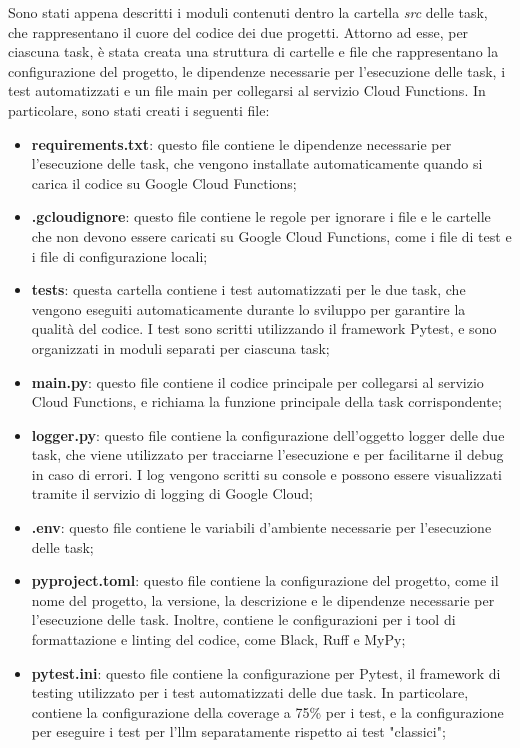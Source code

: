 Sono stati appena descritti i moduli contenuti dentro la cartella \emph{src} delle task, che rappresentano il cuore del codice dei due progetti. Attorno ad esse, per ciascuna task, è stata creata una struttura di cartelle e file che rappresentano la configurazione del progetto, le dipendenze necessarie per l'esecuzione delle task, i test automatizzati e un file main per collegarsi al servizio Cloud Functions. In particolare, sono stati creati i seguenti file:
\begin{itemize}
    \item \textbf{requirements.txt}: questo file contiene le dipendenze necessarie per l'esecuzione delle task, che vengono installate automaticamente quando si carica il codice su Google Cloud Functions;
    \item \textbf{.gcloudignore}: questo file contiene le regole per ignorare i file e le cartelle che non devono essere caricati su Google Cloud Functions, come i file di test e i file di configurazione locali;
    \item \textbf{tests}: questa cartella contiene i test automatizzati per le due task, che vengono eseguiti automaticamente durante lo sviluppo per garantire la qualità del codice. I test sono scritti utilizzando il framework Pytest, e sono organizzati in moduli separati per ciascuna task;
    \item \textbf{main.py}: questo file contiene il codice principale per collegarsi al servizio Cloud Functions, e richiama la funzione principale della task corrispondente;
    \item \textbf{logger.py}: questo file contiene la configurazione dell'oggetto logger delle due task, che viene utilizzato per tracciarne l'esecuzione e per facilitarne il debug in caso di errori. I log vengono scritti su console e possono essere visualizzati tramite il servizio di logging di Google Cloud;
    \item \textbf{.env}: questo file contiene le variabili d'ambiente necessarie per l'esecuzione delle task;
    \item \textbf{pyproject.toml}: questo file contiene la configurazione del progetto, come il nome del progetto, la versione, la descrizione e le dipendenze necessarie per l'esecuzione delle task. Inoltre, contiene le configurazioni per i tool di formattazione e linting del codice, come Black, Ruff e MyPy;
    \item \textbf{pytest.ini}: questo file contiene la configurazione per Pytest, il framework di testing utilizzato per i test automatizzati delle due task. In particolare, contiene la configurazione della coverage a 75\% per i test, e la configurazione per eseguire i test per l'\gls{llm} separatamente rispetto ai test "classici";

\end{itemize}
